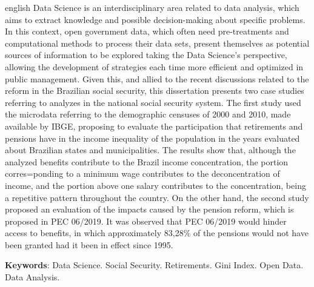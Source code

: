 \begin{resumo}[Abstract]
 \begin{otherlanguage*}{english}
 Data Science is an interdisciplinary area related to data analysis, which aims to extract knowledge and possible decision-making about specific problems. In this context, open government data, which often need pre-treatments and computational methods to process their data sets, present themselves as potential sources of information to be explored taking the Data Science's perspective, allowing the development of strategies each time more efficient and optimized in public management. Given this, and allied to the recent discussions related to the reform in the Brazilian social security, this dissertation presents two case studies referring to analyzes in the national social security system. The first study used the microdata referring to the demographic censuses of 2000 and 2010, made available by IBGE, proposing to evaluate the participation that retirements and pensions have in the income inequality of the population in the years evaluated about Brazilian states and municipalities. The results show that, although the analyzed benefits contribute to the Brazil income concentration, the portion corres=ponding to a minimum wage contributes to the deconcentration of income, and the portion above one salary contributes to the concentration, being a repetitive pattern throughout the country. On the other hand, the second study proposed an evaluation of the impacts caused by the pension reform, which is proposed in PEC 06/2019. It was observed that PEC 06/2019 would hinder access to benefits, in which approximately 83,28\% of the pensions would not have been granted had it been in effect since 1995.

\vspace{\onelineskip}
 
\noindent 
\textbf{Keywords}: Data Science. Social Security. Retirements. Gini Index. Open Data. Data Analysis.
\end{otherlanguage*}
\end{resumo}
